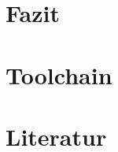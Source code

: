 \documentclass{beamer}
\begin{document}
\section{Fazit}


\frame{

}


%
\section{Toolchain}


\section{Literatur}

\end{document}
